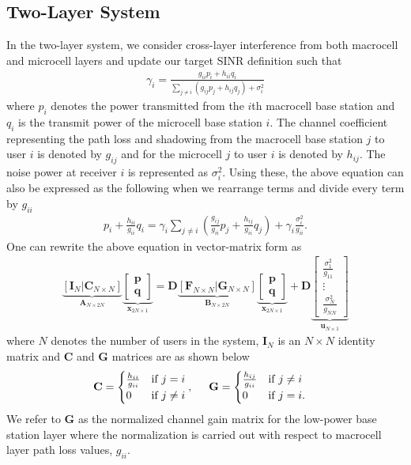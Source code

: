 \documentclass[conference,letterpaper,final,10pt]{IEEEtran}
\newcommand{\bea}{\begin{eqnarray}}
\newcommand{\eea}{\end{eqnarray}}
\def\bary{\begin{array}}
\def\eary{\end{array}}
\begin{document}
\subsection{Two-Layer System}
In the two-layer system, we consider cross-layer interference from both macrocell and microcell
layers and update our target SINR definition such that
\bea \gamma_i = \frac{g_{ii} p_i + h_{ii} q_i}{\sum_{j \neq i}
\left(g_{ij} p_j + h_{ij} q_{j} \right)+\sigma_i^2} \eea where
$p_i$ denotes the power transmitted from the $i$th macrocell base
station and $q_i$ is the transmit power of the microcell base
station $i$. The channel coefficient representing the path loss and shadowing from the macrocell base station $j$ to user $i$ is denoted by $g_{ij}$ and for the microcell $j$ to user $i$ is denoted by $h_{ij}$. The noise power at receiver $i$ is represented as $\sigma_i^2$. Using these, the above equation can also be expressed as the following when we rearrange terms and divide every term by
$g_{ii}$
\begin{align} p_i +
\frac{h_{ii}}{g_{ii}} q_i = \gamma_i \sum_{j \neq i}
\left(\frac{g_{ij}}{g_{ii}} p_j + \frac{h_{ij}}{g_{ii}} q_{j}
\right) + \gamma_i\frac{\sigma_i^2}{g_{ii}}. \end{align} One can rewrite
the above equation in vector-matrix form as \begin{align}
\underbrace{\left[ \textbf{I}_N | \textbf{C}_{N\times N}
\right]}_{\textbf{A}_{N\times
2N}}\underbrace{\left[\bary{c}\textbf{p} \\ \textbf{q}
\eary\right]}_{\textbf{x}_{2N\times 1}} = \textbf{D} \underbrace{\left[\textbf{F}_{N\times N} | \textbf{G}_{N\times N}
\right]}_{\textbf{B}_{N\times 2N}}
\underbrace{\left[\bary{c}\textbf{p} \\ \textbf{q}
\eary\right]}_{\textbf{x}_{2N\times 1}}  + \textbf{D}
\underbrace{\left[\bary{c} \frac{\sigma_1^2}{g_{11}} \\ \vdots \\ \frac{\sigma_N^2}{g_{NN}} \eary\right]}_{\textbf{u}_{N
\times 1}} \nonumber\end{align} where $N$ denotes the number of users in
the system, $\textbf{I}_N$ is an $N\times N$ identity matrix and
$\textbf{C}$ and $\textbf{G}$ matrices are as shown below
\begin{align} \textbf{C} &= \begin{cases} \frac{h_{ii}}{g_{ii}} & \text{if } j = i
\\ 0 & \text{if } j \neq i \end{cases}, \hspace{5mm} \textbf{G}  = \begin{cases}
\frac{h_{ij}}{g_{ii}} & \text{if } j \neq i \\ 0 &
\text{if } j = i.
\end{cases}\end{align} We refer to $\textbf{G}$ as the normalized channel gain matrix for the low-power base station
layer where the normalization is carried out with respect to macrocell layer path loss values, $g_{ii}$.
\end{document}
